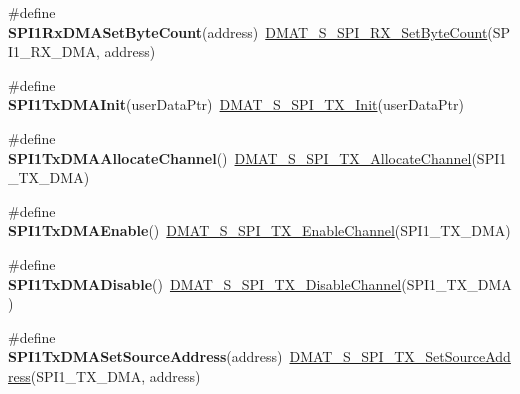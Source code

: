 \begin{DoxyCompactItemize}
\item 
\hypertarget{group___func_ala_ga99786fb01026cf282e35b3e4d5316cd9}{\#define {\bfseries S\-P\-I1\-Rx\-D\-M\-A\-Set\-Byte\-Count}(address)~\hyperlink{group___d_m_a_t___s___s_p_i___r_x__module_ga28f3ef5862a3dacce62334dd0ea34e4b}{D\-M\-A\-T\-\_\-\-S\-\_\-\-S\-P\-I\-\_\-\-R\-X\-\_\-\-Set\-Byte\-Count}(S\-P\-I1\-\_\-\-R\-X\-\_\-\-D\-M\-A, address)}\label{group___func_ala_ga99786fb01026cf282e35b3e4d5316cd9}

\item 
\hypertarget{group___func_ala_ga5010e25f47c740a2242febcadfe1f0e9}{\#define {\bfseries S\-P\-I1\-Tx\-D\-M\-A\-Init}(user\-Data\-Ptr)~\hyperlink{group___d_m_a_t___s___s_p_i___t_x__module_gadc51deea2770bb347ac7cc376a58aa9b}{D\-M\-A\-T\-\_\-\-S\-\_\-\-S\-P\-I\-\_\-\-T\-X\-\_\-\-Init}(user\-Data\-Ptr)}\label{group___func_ala_ga5010e25f47c740a2242febcadfe1f0e9}

\item 
\hypertarget{group___func_ala_ga953a0339b753607762c6d57930354b22}{\#define {\bfseries S\-P\-I1\-Tx\-D\-M\-A\-Allocate\-Channel}()~\hyperlink{group___d_m_a_t___s___s_p_i___t_x__module_ga70b5c8f860f965e1d9d61503b9bee8a6}{D\-M\-A\-T\-\_\-\-S\-\_\-\-S\-P\-I\-\_\-\-T\-X\-\_\-\-Allocate\-Channel}(S\-P\-I1\-\_\-\-T\-X\-\_\-\-D\-M\-A)}\label{group___func_ala_ga953a0339b753607762c6d57930354b22}

\item 
\hypertarget{group___func_ala_ga493b19020a10f29a2c978b38b31340e7}{\#define {\bfseries S\-P\-I1\-Tx\-D\-M\-A\-Enable}()~\hyperlink{group___d_m_a_t___s___s_p_i___t_x__module_ga522c738ebb05fecbf0be1b523eb96df9}{D\-M\-A\-T\-\_\-\-S\-\_\-\-S\-P\-I\-\_\-\-T\-X\-\_\-\-Enable\-Channel}(S\-P\-I1\-\_\-\-T\-X\-\_\-\-D\-M\-A)}\label{group___func_ala_ga493b19020a10f29a2c978b38b31340e7}

\item 
\hypertarget{group___func_ala_ga43298825b4c880969a9898774b99a1cb}{\#define {\bfseries S\-P\-I1\-Tx\-D\-M\-A\-Disable}()~\hyperlink{group___d_m_a_t___s___s_p_i___t_x__module_ga181b8a0f23d6295dfe87d2fccc5a60e0}{D\-M\-A\-T\-\_\-\-S\-\_\-\-S\-P\-I\-\_\-\-T\-X\-\_\-\-Disable\-Channel}(S\-P\-I1\-\_\-\-T\-X\-\_\-\-D\-M\-A)}\label{group___func_ala_ga43298825b4c880969a9898774b99a1cb}

\item 
\hypertarget{group___func_ala_ga0aeda0eab44885dd0dd2676300b5ecd2}{\#define {\bfseries S\-P\-I1\-Tx\-D\-M\-A\-Set\-Source\-Address}(address)~\hyperlink{group___d_m_a_t___s___s_p_i___t_x__module_ga2cc9601ddecfccead74aae54533d9c22}{D\-M\-A\-T\-\_\-\-S\-\_\-\-S\-P\-I\-\_\-\-T\-X\-\_\-\-Set\-Source\-Address}(S\-P\-I1\-\_\-\-T\-X\-\_\-\-D\-M\-A, address)}\label{group___func_ala_ga0aeda0eab44885dd0dd2676300b5ecd2}


\end{DoxyCompactItemize}
